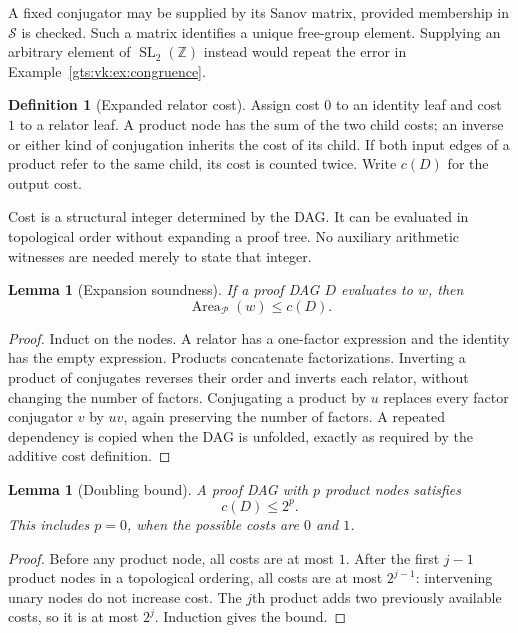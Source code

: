 \documentclass[11pt,letterpaper]{article}
\newtheorem{lemma}[theorem]{Lemma}
\theoremstyle{definition}
\newtheorem{definition}[theorem]{Definition}
\theoremstyle{remark}
\newcommand{\Z}{\mathbb Z}
\newcommand{\Pp}{\mathcal P}
\newcommand{\San}{\mathcal S}
\newcommand{\Area}{\operatorname{Area}}
\newcommand{\SL}{\operatorname{SL}}
\begin{document}
A fixed conjugator may be supplied by its Sanov matrix, provided membership in $\San$ is checked. Such a matrix identifies a unique free-group element. Supplying an arbitrary element of $\SL_2(\Z)$ instead would repeat the error in Example~\ref{gts:vk:ex:congruence}.

\begin{definition}[Expanded relator cost]
Assign cost $0$ to an identity leaf and cost $1$ to a relator leaf. A product node has the sum of the two child costs; an inverse or either kind of conjugation inherits the cost of its child. If both input edges of a product refer to the same child, its cost is counted twice. Write $c(D)$ for the output cost.
\end{definition}

Cost is a structural integer determined by the DAG. It can be evaluated in topological order without expanding a proof tree. No auxiliary arithmetic witnesses are needed merely to state that integer.

\begin{lemma}[Expansion soundness]\label{gts:vk:lem:dag-area}
If a proof DAG $D$ evaluates to $w$, then
\begin{equation}\label{gts:vk:eq:dag-area}
 \Area_{\Pp}(w)\leq c(D).
\end{equation}
\end{lemma}

\begin{proof}
Induct on the nodes. A relator has a one-factor expression and the identity has the empty expression. Products concatenate factorizations. Inverting a product of conjugates reverses their order and inverts each relator, without changing the number of factors. Conjugating a product by $u$ replaces every factor conjugator $v$ by $uv$, again preserving the number of factors. A repeated dependency is copied when the DAG is unfolded, exactly as required by the additive cost definition.
\end{proof}

\begin{lemma}[Doubling bound]\label{gts:vk:lem:dag-doubling}
A proof DAG with $p$ product nodes satisfies
\begin{equation}\label{gts:vk:eq:dag-doubling}
 c(D)\leq2^p.
\end{equation}
This includes $p=0$, when the possible costs are $0$ and $1$.
\end{lemma}

\begin{proof}
Before any product node, all costs are at most $1$. After the first $j-1$ product nodes in a topological ordering, all costs are at most $2^{j-1}$: intervening unary nodes do not increase cost. The $j$th product adds two previously available costs, so it is at most $2^j$. Induction gives the bound.
\end{proof}
\end{document}

